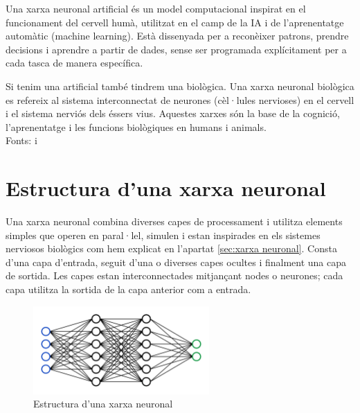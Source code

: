 Una xarxa neuronal artificial és un model computacional inspirat en el funcionament del cervell humà, utilitzat en el camp de la IA i de l'aprenentatge automàtic (machine learning). Està dissenyada per a reconèixer patrons, prendre decisions i aprendre a partir de dades, sense ser programada explícitament per a cada tasca de manera específica.

Si tenim una artificial també tindrem una biològica. Una xarxa neuronal biològica es refereix al sistema interconnectat de neurones (cèl·lules nervioses) en el cervell i el sistema nerviós dels éssers vius. Aquestes xarxes són la base de la cognició, l'aprenentatge i les funcions biològiques en humans i animals.\\
Fonts: \cite{UOC} i \cite{XarxaBiologica}

\section{Estructura d'una xarxa neuronal}\label{sec:3.6}
Una xarxa neuronal combina diverses capes de processament i utilitza elements simples que operen en paral·lel, simulen i estan inspirades en els sistemes nerviosos biològics com hem explicat en l'apartat \ref{sec:xarxa neuronal}. Consta d'una capa d'entrada, seguit d'una o diverses capes ocultes i finalment una capa de sortida. Les capes estan interconnectades mitjançant nodes o neurones; cada capa utilitza la sortida de la capa anterior com a entrada.

\begin{figure}[h!]
    \centering
    \includegraphics[width=0.6\textwidth]{./figures/xarxa.png}
    \caption{Estructura d'una xarxa neuronal}
\end{figure}

